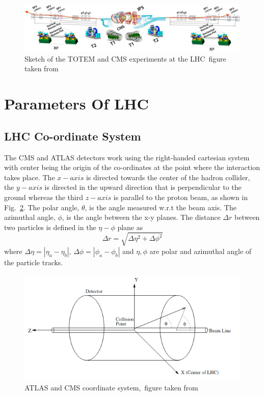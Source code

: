 \begin{figure}[H]
\centering
\includegraphics[scale=0.7]{chapter2/totem.jpg}
\caption{Sketch of the TOTEM and CMS experiments at the LHC~figure taken from~\cite{article}}
\label{Totem}
\end{figure}

\section{Parameters Of LHC}
\subsection{LHC Co-ordinate System}
The CMS and ATLAS detectors work using the right-handed cartesian system with center being the origin of the co-ordinates at the point where the interaction takes place. The $x-axis$ is directed towards the center of the hadron collider, the $y-axis$ is directed in the upward direction that is perpendicular to the ground whereas the third $z-axis$ is parallel to the proton beam, as shown in Fig.~\ref{co-ordinate lhc}. The polar angle, $\theta$, is the angle measured w.r.t the beam axis. The azimuthal angle, $\phi$, is the angle between the x-y planes. The distance $\Delta r$ between two particles is defined in the $\eta-\phi$ plane as
\begin{equation}
\Delta r = \sqrt{\Delta \eta^{2}+\Delta \phi^{2}}
\end{equation}
where $\Delta \eta=|\eta_{a}-\eta_{b}|$, $\Delta\phi=|\phi_{a}-\phi_{b}|$ and $\eta, \phi$ are polar and azimuthal angle of the particle tracks.
\begin{figure}[H]
\centering
\includegraphics[scale=0.6]{chapter2/coordinate.png}
\caption{ATLAS and CMS coordinate system,~figure taken from~\cite{Schott_2014}}
\label{co-ordinate lhc}
\end{figure}
